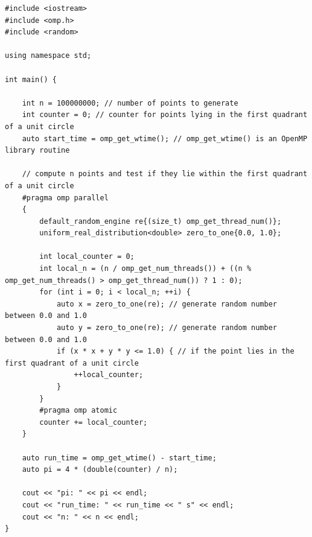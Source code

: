 \documentclass[../../main.tex]{subfiles}
\begin{document}
\smallbreak
\smallbreak
\begin{samepage}
\begin{lstlisting}
#include <iostream>
#include <omp.h>
#include <random>

using namespace std;

int main() {
    
    int n = 100000000; // number of points to generate
    int counter = 0; // counter for points lying in the first quadrant of a unit circle
    auto start_time = omp_get_wtime(); // omp_get_wtime() is an OpenMP library routine

    // compute n points and test if they lie within the first quadrant of a unit circle
    #pragma omp parallel
    {
        default_random_engine re{(size_t) omp_get_thread_num()};
        uniform_real_distribution<double> zero_to_one{0.0, 1.0};

        int local_counter = 0;
        int local_n = (n / omp_get_num_threads()) + ((n % omp_get_num_threads() > omp_get_thread_num()) ? 1 : 0);
        for (int i = 0; i < local_n; ++i) {
            auto x = zero_to_one(re); // generate random number between 0.0 and 1.0
            auto y = zero_to_one(re); // generate random number between 0.0 and 1.0
            if (x * x + y * y <= 1.0) { // if the point lies in the first quadrant of a unit circle
                ++local_counter;
            }
        }
        #pragma omp atomic
        counter += local_counter;
    }

    auto run_time = omp_get_wtime() - start_time;
    auto pi = 4 * (double(counter) / n);

    cout << "pi: " << pi << endl;
    cout << "run_time: " << run_time << " s" << endl;
    cout << "n: " << n << endl;
}
\end{lstlisting}
\end{samepage}
\end{document}

